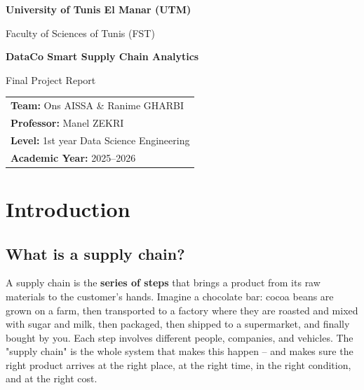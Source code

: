 \documentclass[12pt, a4paper]{report}
\begin{document}
\begin{titlepage}
\begin{center}
      \vspace{0.6cm}
      {\color{navy}\Large\bfseries University of Tunis El Manar (UTM)\par}
      {\color{navy}\large Faculty of Sciences of Tunis (FST)\par}
      \vspace{2.2cm}
      {\color{navy}\Huge\bfseries DataCo Smart Supply Chain Analytics\par}
      \vspace{0.5cm}
      {\color{teal}\Large Final Project Report\par}
      \vspace{1.8cm}
      {\color{navy}\large
      \begin{tabular}{@{}l@{}}
         \textbf{Team:} Ons AISSA \& Ranime GHARBI \\[0.2cm]
         \textbf{Professor:} Manel ZEKRI \\[0.2cm]
         \textbf{Level:} 1st year Data Science Engineering \\[0.2cm]
         \textbf{Academic Year:} 2025–2026
      \end{tabular}
      \par}
      \vspace{2.2cm}
      {\color{teal}\Huge
         \faPython \hspace{0.8cm}
         \faFire \hspace{0.8cm}
         \faDatabase \hspace{0.8cm}
         \faChartLine \hspace{0.8cm}
         \faRobot \hspace{0.8cm}
         \faRandom
      }
      \vfill
   \end{center}
\end{titlepage}

\thispagestyle{empty}
\tableofcontents
\clearpage


\chapter{Introduction}
\section{What is a supply chain?}
A supply chain is the \textbf{series of steps} that brings a product from its raw materials to the customer's hands.  
Imagine a chocolate bar: cocoa beans are grown on a farm, then transported to a factory where they are roasted and mixed with sugar and milk, then packaged, then shipped to a supermarket, and finally bought by you. Each step involves different people, companies, and vehicles. The "supply chain" is the whole system that makes this happen – and makes sure the right product arrives at the right place, at the right time, in the right condition, and at the right cost.
\end{document}
